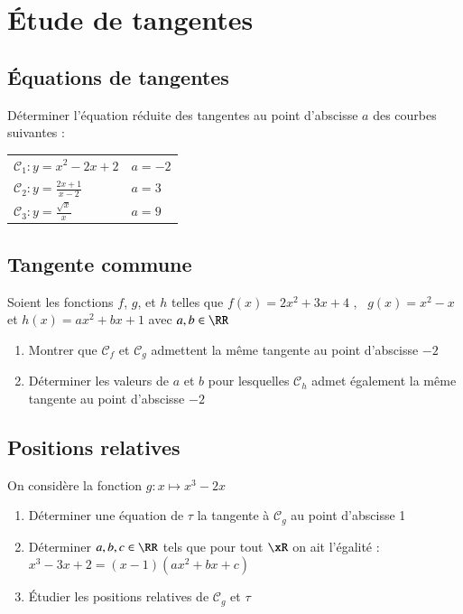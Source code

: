 \documentclass[oneside,12pt]{article}          %
\begin{document}
\section{Étude de tangentes}

\subsection{Équations de tangentes}
 Déterminer l'équation réduite des tangentes au point d'abscisse $a$ des courbes suivantes : 

\renewcommand{\arraystretch}{1.4}
\begin{tabular}{p{} p{}}

    $\mathscr{C}_1:y=x^{2}-2x+2$ & $a=-2$ \\
    $\mathscr{C}_2:y=\frac{2x+1}{x-2}$ & $a=3$ \\
    $\mathscr{C}_3:y=\frac{\sqrt{x}}{x}$ & $a=9$
\end{tabular}



\subsection{Tangente commune}
 Soient les fonctions $f$, $g$, et $h$ telles que $f(x)=2x^{2}+3x+4$ ,~ $g(x)= x^{2}-x$ et $h(x)= ax^{2}+bx+1$ avec $a,b\in\RR$

\begin{enumerate}
    \item Montrer que $\mathscr{C}_{f}$ et $\mathscr{C}_{g}$ admettent la même tangente au point d'abscisse $-2$
    \item Déterminer les valeurs de $a$ et $b$ pour lesquelles $\mathscr{C}_{h}$ admet également la même tangente au point d'abscisse $-2$
\end{enumerate}



\subsection{Positions relatives}
 On considère la fonction $g:x\mapsto x^{3}-2x$

\begin{enumerate}
    \item Déterminer une équation de $\tau$ la tangente à $\mathscr{C}_{g}$ au point d'abscisse 1
    \item Déterminer $a,b,c\in\RR$ tels que pour tout $\xR$ on ait l'égalité :\\ $x^{3}-3x+2 = (x-1)(ax^{2}+bx+c) $
    \item Étudier les positions relatives de $\mathscr{C}_{g}$ et $\tau$
\end{enumerate}
\end{document}
